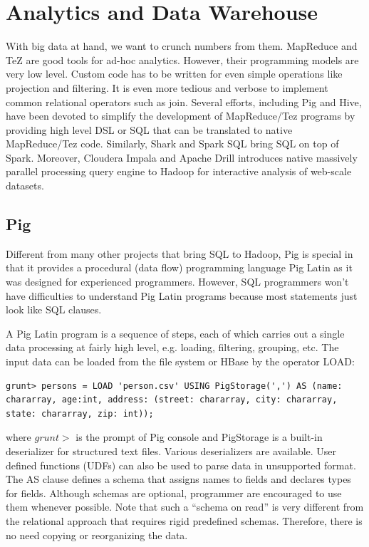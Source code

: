 \documentclass[11pt]{book}
\begin{document}
\chapter{Analytics and Data Warehouse}
With big data at hand, we want to crunch numbers from them. MapReduce and TeZ are good tools for ad-hoc analytics. However, their programming models are very low level. Custom code has to be written for even simple operations like projection and filtering. It is even more tedious and verbose to implement common relational operators such as join. Several efforts, including Pig and Hive, have been devoted to simplify the development of MapReduce/Tez programs by providing high level DSL or SQL that can be translated to native MapReduce/Tez code. Similarly, Shark and Spark SQL bring SQL on top of Spark. Moreover, Cloudera Impala and Apache Drill introduces native massively parallel processing query engine to Hadoop for interactive analysis of web-scale datasets. 

\section{Pig}
Different from many other projects that bring SQL to Hadoop, Pig is special in that it provides a procedural (data flow) programming language Pig Latin as it was designed for experienced programmers. However, SQL programmers won't have difficulties to understand Pig Latin programs because most statements just look like SQL clauses.

A Pig Latin program is a sequence of steps, each of which carries out a single data processing at fairly high level, e.g. loading, filtering, grouping, etc. The input data can be loaded from the file system or HBase by the operator LOAD:

\begin{lstlisting}
grunt> persons = LOAD 'person.csv' USING PigStorage(',') AS (name: chararray, age:int, address: (street: chararray, city: chararray, state: chararray, zip: int));
\end{lstlisting}
where $grunt>$ is the prompt of Pig console and PigStorage is a built-in deserializer for structured text files. Various deserializers are available. User defined functions (UDFs) can also be used to parse data in unsupported format. The AS clause defines a schema that assigns names to fields and declares types for fields. Although schemas are optional, programmer are encouraged to use them whenever possible. Note that such a ``schema on read'' is very different from the relational approach that requires rigid predefined schemas. Therefore, there is no need copying or reorganizing the data.
\end{document}
